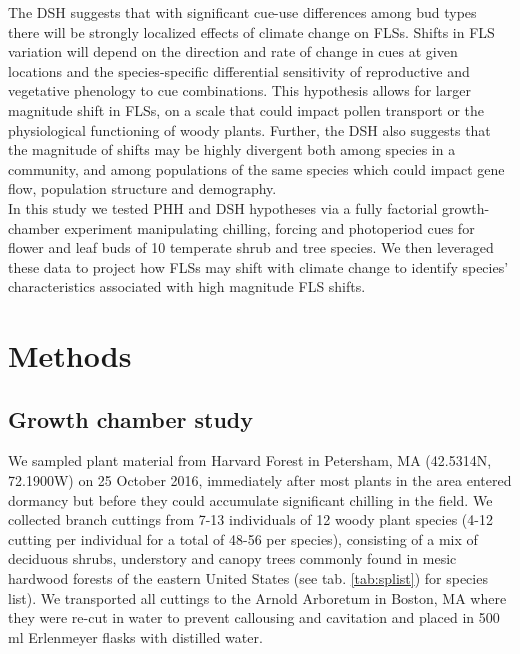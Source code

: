 \documentclass[11pt]{article}\usepackage[]{graphicx}\usepackage[]{color}
\begin{document}
\noindent The DSH suggests that with significant cue-use differences among bud types there will be strongly localized effects of climate change on FLSs. Shifts in FLS variation will depend on the direction and rate of change in cues at given locations and the species-specific differential sensitivity of reproductive and vegetative phenology to cue combinations. This hypothesis allows for larger magnitude shift in FLSs, on a scale that could impact pollen transport or the physiological functioning of woody plants. Further, the DSH also suggests that the magnitude of shifts may be highly divergent both among species in a community, and among populations of the same species which could impact gene flow, population structure and demography.\\

\noindent In this study we tested PHH and DSH hypotheses via a fully factorial growth-chamber experiment manipulating chilling, forcing and photoperiod cues for flower and leaf buds of 10 temperate shrub and tree species. We then leveraged these data to project how FLSs may shift with climate change to identify species' characteristics associated with high magnitude FLS shifts.\\

\section*{Methods}

\subsection*{Growth chamber study}

\noindent We sampled plant material from Harvard Forest in Petersham, MA (42.5314\degree N, 72.1900\degree W) on 25 October 2016, immediately after most plants in the area entered dormancy but before they could accumulate significant chilling in the field. We collected branch cuttings from 7-13 individuals of 12 woody plant species (4-12 cutting per individual for a total of 48-56 per species), consisting of a mix of deciduous shrubs, understory and canopy trees commonly found in mesic hardwood forests of the eastern United States (see tab. \ref{tab:splist}) for species list). We transported all cuttings to the Arnold Arboretum in Boston, MA where they were re-cut in water to prevent callousing and cavitation and placed in 500 ml Erlenmeyer flasks with distilled water.\\ 
\end{document}
